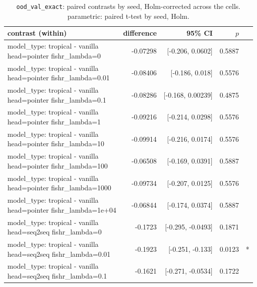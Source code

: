 \documentclass[10pt]{article}
\makeatletter
\newcommand{\stackcell}[1]{\begin{tabular}[t]{@{}l@{}}#1\end{tabular}}
\makeatother
\begin{document}
{\small
\begin{longtable}{lrrrl}
\caption{\texttt{ood\_val\_exact}: paired contrasts by seed, Holm-corrected across the cells. parametric: paired t-test by seed, Holm.}\label{tab:paired-ood_val_exact}\\
\toprule
contrast (within) & difference & 95\% CI & $p$ & \\
\midrule
\endhead
\stackcell{model\_type: tropical - vanilla\\\footnotesize head=pointer fishr\_lambda=0 } & -0.07298 & [-0.206, 0.0602] & 0.5887 & \\
\stackcell{model\_type: tropical - vanilla\\\footnotesize head=pointer fishr\_lambda=0.01 } & -0.08406 & [-0.186, 0.018] & 0.5576 & \\
\stackcell{model\_type: tropical - vanilla\\\footnotesize head=pointer fishr\_lambda=0.1 } & -0.08286 & [-0.168, 0.00239] & 0.4875 & \\
\stackcell{model\_type: tropical - vanilla\\\footnotesize head=pointer fishr\_lambda=1 } & -0.09216 & [-0.214, 0.0298] & 0.5576 & \\
\stackcell{model\_type: tropical - vanilla\\\footnotesize head=pointer fishr\_lambda=10 } & -0.09914 & [-0.216, 0.0174] & 0.5576 & \\
\stackcell{model\_type: tropical - vanilla\\\footnotesize head=pointer fishr\_lambda=100 } & -0.06508 & [-0.169, 0.0391] & 0.5887 & \\
\stackcell{model\_type: tropical - vanilla\\\footnotesize head=pointer fishr\_lambda=1000 } & -0.09734 & [-0.207, 0.0125] & 0.5576 & \\
\stackcell{model\_type: tropical - vanilla\\\footnotesize head=pointer fishr\_lambda=1e+04 } & -0.06844 & [-0.174, 0.0374] & 0.5887 & \\
\stackcell{model\_type: tropical - vanilla\\\footnotesize head=seq2seq fishr\_lambda=0 } & -0.1723 & [-0.295, -0.0493] & 0.1871 & \\
\stackcell{model\_type: tropical - vanilla\\\footnotesize head=seq2seq fishr\_lambda=0.01 } & -0.1923 & [-0.251, -0.133] & 0.0123 & *\\
\stackcell{model\_type: tropical - vanilla\\\footnotesize head=seq2seq fishr\_lambda=0.1 } & -0.1621 & [-0.271, -0.0534] & 0.1722 & \\

\end{longtable}}
\end{document}
